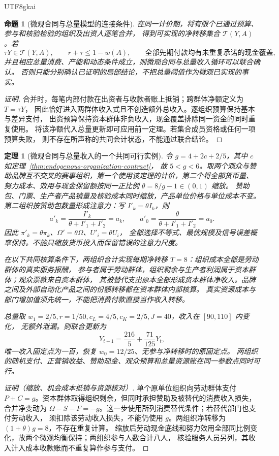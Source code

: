 \documentclass[12pt,a4paper,openany]{report}
\newtheorem{theorem}{定理}[chapter]
\newtheorem{proposition}{命题}[chapter]
\begin{document}
\begin{CJK*}{UTF8}{gkai}
\begin{proposition}[微观合同与总量模型的连接条件]
\label{prop:micro-macro-compatibility}
在同一计价期，将有限个已通过预算、参与和核验检验的组织及出资人逐笔合并，
得到可实现的净转移集合 \(\mathcal T(Y,A)\)。若
\[
 \tau Y\in\mathcal T(Y,A),\qquad
 r+\tau\le1-w(A),\qquad
 \text{全部先期付款均有未重复承诺的现金覆盖},
\]
并且相应总量消费、产能和动态条件成立，则微观合同与总量收入循环可以联合确认。
否则只能分别确认已证明的局部结论，不把总量阈值作为微观已实现的事实。
\end{proposition}
\begin{proof}[证明]
合并时，每笔内部付款在出资者与收款者账上抵销；跨群体净额定义为 \(T=\tau Y\)，
因此恰好进入两群体收入式且不创造额外总收入。逐组织预算保持基本与差异支付，
出资预算保持资本群体非负收入，现金覆盖排除同一资金的同时重复使用。
将该净额代入总量更新即可应用前一定理。若集合成员资格或任何一项预算失败，
则不存在所声称的共同会计状态，不能通过联合结论。
\end{proof}

\begin{theorem}[微观合同与总量收入的一个共同可行实例]
\label{thm:joint-micro-macro-witness}
令 \(g=4+2c+2/5\)，其中 \(c\) 如定理~\ref{thm:endogenous-organization-contract}，
故 \(5<g<6\)。取两个观众与赞助品牌互不交叉的赛事组织，第一个使用该定理的计价，第二个将全部货币量、
努力成本、效用与现金保留额按同一正比例 \(\theta=8/g-1\in(0,1)\) 缩放。
赞助包、门票、生产者产品销量及核验成本同时缩放，产品单位价格与单位成本不变。
第二组织按赞助包数量形成注意力：写 \(I'_k=\theta I_k\)，则
\[
 a'_k=\frac{I'_k}{\theta+I'_1+I'_2}=a_k,\qquad
 a'_0=\frac{\theta}{\theta+I'_1+I'_2}=a_0.
\]
因此 \(\pi'_k=\theta\pi_k\)、\(\Omega'=\theta\Omega\)、\(U'_i=\theta U_i\)，
全部选择不等式、最优规模及信号误差概率保持。不能只缩放货币投入而保留错误的注意力尺度。

在以下共同核算条件下，两组织合计实现每期净转移 \(T=8\)：组织成本全部是劳动群体的真实服务报酬，
参与者属于劳动群体，组织剩余与生产者利润属于资本群体；观众票款来自资本群体，
其被替代支出原本全部形成资本群体净收入。品牌之间及外部自动化产品之间的份额转移都在资本群体内部核算。
真实资源成本与部门增加值须先统一，不能把消费付款直接当作收入转移。

总量取 \(w_1=2/5,r=1/50,c_L=4/5,c_K=2/5,J=40\)，收入在 \([90,110]\) 内变化，
无额外泄漏。则联合更新为
\[
 Y_{t+1}=\frac{216}{5}+\frac{71}{125}Y_t,
\]
唯一收入固定点为一百，恢复 \(w_0=12/25\)、无参与净转移时的原固定点。
两组织的随机支付、正营销收益、赞助现金、观众预算和总量资源账在同一参数点同时可行。
\end{theorem}
\begin{proof}[证明（缩放、机会成本抵销与资源核对）]
单个原单位组织向劳动群体支付 \(P+C=g\)。资本群体取得组织剩余，但同时承担赞助及被替代的消费收入损失，
合并净变动为 \(\Omega-S-F=-g\)。这一步使用所列消费替代条件；若替代部门也支付劳动收入，
须扣除该劳动收入损失，不能仍使用 \(g\)。两组织净转移为 \((1+\theta)g=8\)，不存在重复计算。
缩放后劳动现金底线和努力效用全部同比例变化，故两个微观均衡保持；两组织参与人数合计八人，
核验服务人员另列，其收入计入成本收款账而不重复算作参与支付。


\end{proof}
\end{CJK*}
\end{document}
